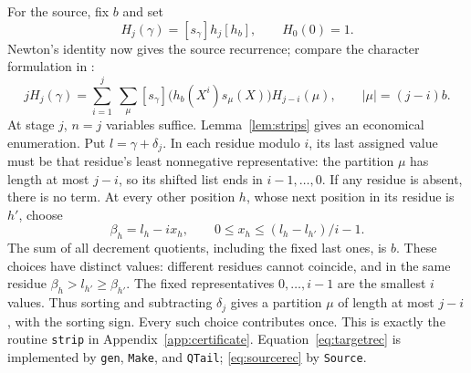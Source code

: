 For the source, fix \(b\) and set
\[
 H_j(\gamma)=[s_\gamma]h_j[h_b],\qquad H_0(0)=1.
\]
Newton's identity now gives the source recurrence; compare the
character formulation in
\cite[Proposition~5.1]{EvseevPagetWildon2014}:
\begin{equation}\label{eq:sourcerec}
 jH_j(\gamma)=\sum_{i=1}^j\ \sum_{\mu}
       [s_\gamma]\bigl(h_b(X^i)s_\mu(X)\bigr)H_{j-i}(\mu),
       \qquad |\mu|=(j-i)b.
\end{equation}
At stage \(j\), \(n=j\) variables suffice. Lemma~\ref{lem:strips} gives
an economical enumeration. Put \(l=\gamma+\delta_j\).
In each residue modulo \(i\), its last assigned
value must be that residue's least nonnegative representative: the
partition \(\mu\) has length at most \(j-i\), so its shifted list ends in
\(i-1,\ldots,0\). If any residue is absent, there is no term. At every
other position \(h\), whose next position in its residue is \(h'\), choose
\[
 \beta_h=l_h-ix_h,\qquad
               0\le x_h\le(l_h-l_{h'})/i-1.
\]
The sum of all decrement quotients, including the fixed last ones, is
\(b\). These choices have distinct values: different residues cannot
coincide, and in the same residue
\(\beta_h>l_{h'}\ge\beta_{h'}\). The fixed representatives
\(0,\ldots,i-1\) are the smallest \(i\) values. Thus sorting and
subtracting \(\delta_j\) gives a partition \(\mu\) of length at most
\(j-i\), with the sorting sign. Every such choice contributes once.
This is exactly the routine \texttt{strip} in Appendix~\ref{app:certificate}.
Equation~\eqref{eq:targetrec} is implemented by \texttt{gen},
\texttt{Make}, and \texttt{QTail}; \eqref{eq:sourcerec} by \texttt{Source}.
